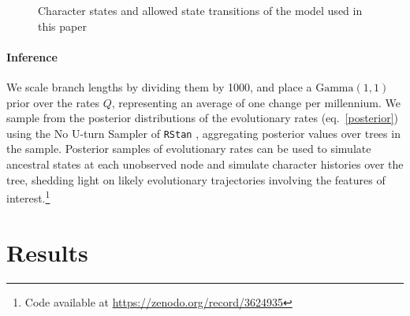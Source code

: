 \documentclass[11pt]{article}
\begin{document}
\begin{figure}
\centering
\begin{adjustbox}{max totalsize={.6\linewidth}{.6\linewidth},center}
\end{adjustbox}
\caption{Character states and allowed state transitions of the model used in this paper}
\label{model}
\end{figure}

\paragraph{Inference}
We scale branch lengths by dividing them by 1000, and place a $\text{Gamma}(1,1)$ prior over the rates $Q$, representing an average of one change per millennium. 
We sample from the posterior distributions of the evolutionary rates (eq.\ \ref{posterior})
using the No U-turn Sampler of {\tt RStan} \citep{Carpenteretal2017}, aggregating posterior values over trees in the sample. 
Posterior samples of evolutionary rates can be used to simulate ancestral states at each unobserved node and simulate character histories over the tree, shedding light on likely evolutionary trajectories involving the features of interest.\footnote{Code available at \url{https://zenodo.org/record/3624935}}


\section{Results}
\label{res}
\end{document}
